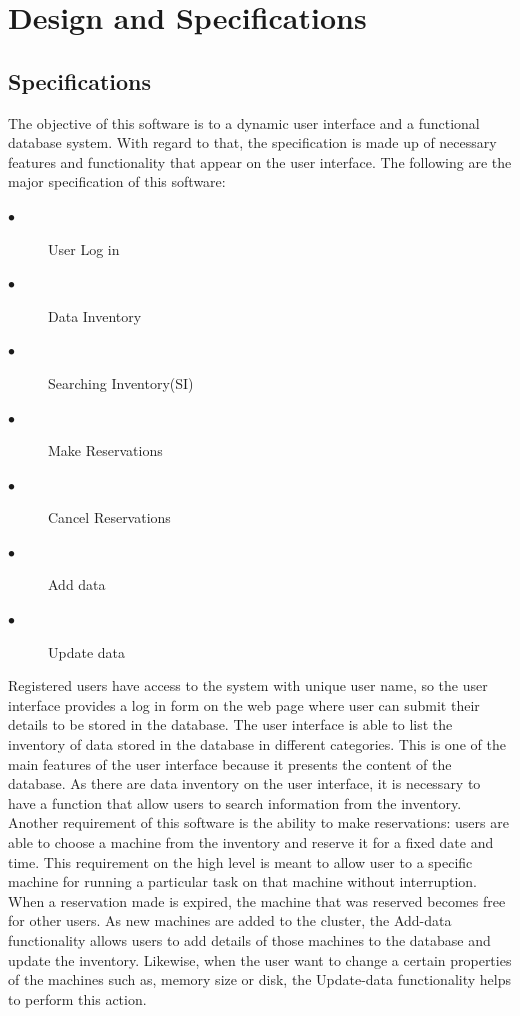 \chapter{Design and Specifications}
\label{chap:figtab}
\label{chap}

\section{Specifications}

 The objective of this software is to  a dynamic user interface and a functional database system. With regard to that, the specification is made up of necessary features and functionality that appear on the user interface. The following are the major specification of this software:
\begin{description}
\item[$\bullet$] User Log in
\item[$\bullet$] Data Inventory
\item[$\bullet$] Searching Inventory(SI)
\item[$\bullet$] Make Reservations
\item[$\bullet$] Cancel Reservations
\item[$\bullet$] Add data
\item[$\bullet$] Update data
\end{description}
Registered users have access to the system with unique user name, so the user interface provides a log in form on the web page where user can submit their details to be stored in the database. The user interface is able to list the inventory of data stored in the database in different categories. This is one of the main features of the user interface because it presents the content of the database. As there are data inventory on the user interface, it is necessary to have a function that allow users to search information from the inventory.  Another requirement of this software is the ability to make reservations: users are able to choose a machine from the inventory and reserve it for a fixed date and time. This requirement on the high level is meant to allow user to a specific machine for running a particular task on that machine without interruption. When a reservation made is expired, the machine that was reserved becomes free for other users. As new machines are added to the cluster, the Add-data functionality allows users to add details of those machines to the database and update the inventory. Likewise, when the user want to change a certain properties of the machines such as, memory size or disk, the Update-data functionality helps to perform this action.


